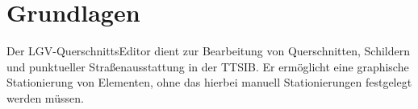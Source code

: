 \documentclass[a4paper,11pt,bibliography=totoc, listof=totoc,titlepage]{scrartcl}
\renewcommand{\arraystretch}{1.5}
\begin{document}


\providecommand{\citeTwo}[4]{\citep[{\citealp[#1]{#2};}][#3]{#4}} 
\providecommand{\citeThree}[6]{\citep[{\citealp[#1]{#2}; \citealp[#3]{#4};}][#5]{#6}} 
\providecommand{\citeFour}[8]{\citep[{\citealp[#1]{#2}; \citealp[#3]{#4}; \citealp[#5]{#6};}][#7]{#8}}

\newpage

\tableofcontents
\newpage

\setcounter{page}{1} 

\section{Grundlagen}
Der LGV-QuerschnittsEditor dient zur Bearbeitung von \Gls{Querschnitt}en, Schildern und punktueller Straßenausstattung in der TTSIB. Er ermöglicht eine graphische Stationierung von Elementen, ohne das hierbei manuell Stationierungen festgelegt werden müssen.
\end{document}
